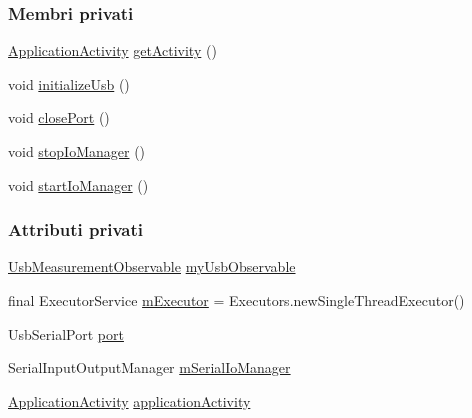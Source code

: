 \subsubsection*{Membri privati}
\begin{DoxyCompactItemize}
\item 
\hyperlink{classit_1_1unibo_1_1torsello_1_1bluetoothpositioning_1_1activities_1_1ApplicationActivity}{Application\+Activity} \hyperlink{classit_1_1unibo_1_1torsello_1_1bluetoothpositioning_1_1util_1_1UsbUtil_a625b1885830a4d2c359a534834a46648_a625b1885830a4d2c359a534834a46648}{get\+Activity} ()
\item 
void \hyperlink{classit_1_1unibo_1_1torsello_1_1bluetoothpositioning_1_1util_1_1UsbUtil_a12b05cc1420c35ea8072d16253ab362e_a12b05cc1420c35ea8072d16253ab362e}{initialize\+Usb} ()
\item 
void \hyperlink{classit_1_1unibo_1_1torsello_1_1bluetoothpositioning_1_1util_1_1UsbUtil_acfc389f97d1eae6eabe803bf16b49f7d_acfc389f97d1eae6eabe803bf16b49f7d}{close\+Port} ()
\item 
void \hyperlink{classit_1_1unibo_1_1torsello_1_1bluetoothpositioning_1_1util_1_1UsbUtil_ae33eeba2e0dc8e8a40b83afea3ff8542_ae33eeba2e0dc8e8a40b83afea3ff8542}{stop\+Io\+Manager} ()
\item 
void \hyperlink{classit_1_1unibo_1_1torsello_1_1bluetoothpositioning_1_1util_1_1UsbUtil_ae6dea43af2962f682be4e87b11699c00_ae6dea43af2962f682be4e87b11699c00}{start\+Io\+Manager} ()
\end{DoxyCompactItemize}
\subsubsection*{Attributi privati}
\begin{DoxyCompactItemize}
\item 
\hyperlink{classit_1_1unibo_1_1torsello_1_1bluetoothpositioning_1_1observables_1_1UsbMeasurementObservable}{Usb\+Measurement\+Observable} \hyperlink{classit_1_1unibo_1_1torsello_1_1bluetoothpositioning_1_1util_1_1UsbUtil_a1c500d0f1a3f3a11b16015acc49929e0_a1c500d0f1a3f3a11b16015acc49929e0}{my\+Usb\+Observable}
\item 
final Executor\+Service \hyperlink{classit_1_1unibo_1_1torsello_1_1bluetoothpositioning_1_1util_1_1UsbUtil_a0b5ea6576e2234b8f7a43343b598d637_a0b5ea6576e2234b8f7a43343b598d637}{m\+Executor} = Executors.\+new\+Single\+Thread\+Executor()
\item 
Usb\+Serial\+Port \hyperlink{classit_1_1unibo_1_1torsello_1_1bluetoothpositioning_1_1util_1_1UsbUtil_a49aef08510b6d48d627670d834099c36_a49aef08510b6d48d627670d834099c36}{port}
\item 
Serial\+Input\+Output\+Manager \hyperlink{classit_1_1unibo_1_1torsello_1_1bluetoothpositioning_1_1util_1_1UsbUtil_aba070ed30c34ed6fd900b30452817b4b_aba070ed30c34ed6fd900b30452817b4b}{m\+Serial\+Io\+Manager}
\item 
\hyperlink{classit_1_1unibo_1_1torsello_1_1bluetoothpositioning_1_1activities_1_1ApplicationActivity}{Application\+Activity} \hyperlink{classit_1_1unibo_1_1torsello_1_1bluetoothpositioning_1_1util_1_1UsbUtil_afdcd78c04f043fafe29eb2cc006b5843_afdcd78c04f043fafe29eb2cc006b5843}{application\+Activity}
\end{DoxyCompactItemize}
